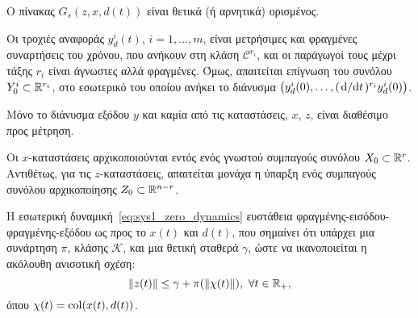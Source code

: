 \begin{assumption}
\label{assumption:posdef}
    Ο πίνακας $G_s(z, x, d(t))$ είναι θετικά (ή αρνητικά) ορισμένος.
\end{assumption}

\begin{assumption}
\label{assumption:reference}
    Οι τροχιές αναφοράς $y_d^i(t)$, $i = 1, \ldots, m$, είναι μετρήσιμες και φραγμένες συναρτήσεις του χρόνου, που ανήκουν στη κλάση $\mathcal C^{r_i}$, και οι παράγωγοί τους μέχρι τάξης $r_i$ είναι άγνωστες αλλά φραγμένες. Όμως, απαιτείται επίγνωση του συνόλου $Y_0^i \subset \mathbb{R}^{r_i}$, στο εσωτερικό του οποίου ανήκει το διάνυσμα $\pqty{y_d^i(0), \ldots, (\dv*{}{t})^{r_i} y_d^i(0)}$. 
\end{assumption}

\begin{assumption}
\label{assumption:output}
    Μόνο το διάνυσμα εξόδου $y$ και καμία από τις καταστάσεις, $x$, $z$, είναι διαθέσιμο προς μέτρηση.
\end{assumption}

\begin{assumption}
\label{assumption:init_set}
    Οι $x$-καταστάσεις αρχικοποιούνται εντός ενός γνωστού συμπαγούς συνόλου $X_0 \subset \mathbb{R}^r$. Αντιθέτως, για τις $z$-καταστάσεις, απαιτείται μονάχα η ύπαρξη ενός συμπαγούς συνόλου αρχικοποίησης $Z_0 \subset \mathbb{R}^{n-r}$.
\end{assumption}

\begin{assumption}
\label{assumption:bibs}
    Η εσωτερική δυναμική~\eqref{eq:sys1_zero_dynamics} ευστάθεια φραγμένης-εισόδου-φραγμένης-εξόδου ως προς το $x(t)$ και $d(t)$, που σημαίνει ότι υπάρχει μια συνάρτηση $\pi$, κλάσης $\mathcal{K}$, και μια θετική σταθερά $\gamma$, ώστε να ικανοποιείται η ακόλουθη ανισοτική σχέση:
    \begin{equation}
    \label{eq:bibs}                
        \norm{z(t)} \leq \gamma + \pi\pqty{\norm{\chi(t)}},\ \forall t \in \R_+,
    \end{equation}
    όπου $\chi(t) = \operatorname{col}(x(t), d(t))$.

\end{assumption}


